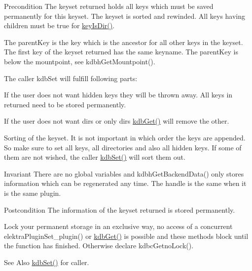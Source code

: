 \begin{DoxyPrecond}{Precondition}
The keyset {\ttfamily returned} holds all keys which must be saved permanently for this keyset. The keyset is sorted and rewinded. All keys having children must be true for \hyperlink{group__keytest_gac0a10c602d52a35f81347e8a32312017}{key\-Is\-Dir()}.

The {\ttfamily parent\-Key} is the key which is the ancestor for all other keys in the keyset. The first key of the keyset {\ttfamily returned} has the same keyname. The parent\-Key is below the mountpoint, see kdbh\-Get\-Mountpoint().

The caller kdb\-Set will fulfill following parts\-:
\begin{DoxyItemize}
\item If the user does not want hidden keys they will be thrown away. All keys in {\ttfamily returned} need to be stored permanently.
\item If the user does not want dirs or only dirs \hyperlink{group__kdb_ga28e385fd9cb7ccfe0b2f1ed2f62453a1}{kdb\-Get()} will remove the other.
\item Sorting of the keyset. It is not important in which order the keys are appended. So make sure to set all keys, all directories and also all hidden keys. If some of them are not wished, the caller \hyperlink{group__kdb_ga11436b058408f83d303ca5e996832bcf}{kdb\-Set()} will sort them out.
\end{DoxyItemize}
\end{DoxyPrecond}
\begin{DoxyInvariant}{Invariant}
There are no global variables and kdbh\-Get\-Backend\-Data() only stores information which can be regenerated any time. The handle is the same when it is the same plugin.
\end{DoxyInvariant}
\begin{DoxyPostcond}{Postcondition}
The information of the keyset {\ttfamily returned} is stored permanently.
\end{DoxyPostcond}
Lock your permanent storage in an exclusive way, no access of a concurrent elektra\-Plugin\-Set\-\_\-plugin() or \hyperlink{group__kdb_ga28e385fd9cb7ccfe0b2f1ed2f62453a1}{kdb\-Get()} is possible and these methods block until the function has finished. Otherwise declare kdbc\-Getno\-Lock().

\begin{DoxySeeAlso}{See Also}
\hyperlink{group__kdb_ga11436b058408f83d303ca5e996832bcf}{kdb\-Set()} for caller.
\end{DoxySeeAlso}

